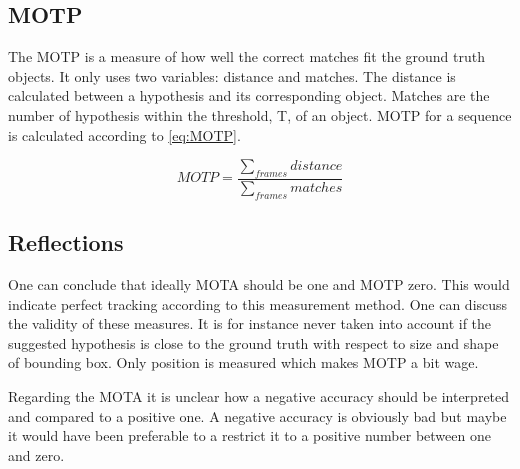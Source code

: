 \subsection{MOTP}
The MOTP is a measure of how well the correct matches fit the ground truth objects. It only uses two variables: distance and matches. The distance is calculated between a hypothesis and its corresponding object. Matches are the number of hypothesis within the 
threshold, T, of an object. MOTP for a sequence is calculated according to \eqref{eq:MOTP}.

\begin{equation}
\label{eq:MOTP}
MOTP = \frac{\sum_{frames}{distance}}{\sum_{frames}{matches}}
\end{equation}

\subsection{Reflections}
One can conclude that ideally MOTA should be one and MOTP zero. This would indicate perfect tracking according to this measurement method. One can discuss the validity of these measures. It is for instance never taken into account if the suggested hypothesis is close to the ground truth with respect to size and shape of bounding box. Only position is measured which makes MOTP a bit wage.

Regarding the MOTA it is unclear how a negative accuracy should be interpreted and compared to a positive one. A negative accuracy is obviously bad but maybe it would have been preferable to a restrict it to a positive number between one and zero.

